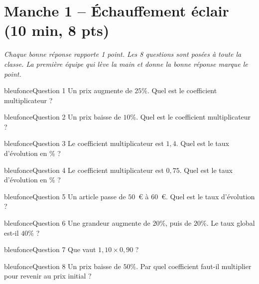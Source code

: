 \documentclass[12pt,a4paper]{article}
\begin{document}
\newpage

\section*{Manche 1 -- Échauffement éclair (10 min, 8 pts)}

\textit{Chaque bonne réponse rapporte 1 point. Les 8 questions sont posées à toute la classe. La première équipe qui lève la main et donne la bonne réponse marque le point.}

\vspace{0.3cm}

\begin{carte}{bleufonce}{Question 1}
Un prix augmente de \(25\%\). Quel est le coefficient multiplicateur ?
\end{carte}

\begin{carte}{bleufonce}{Question 2}
Un prix baisse de \(10\%\). Quel est le coefficient multiplicateur ?
\end{carte}

\begin{carte}{bleufonce}{Question 3}
Le coefficient multiplicateur est \(1{,}4\). Quel est le taux d’évolution en \% ?
\end{carte}

\begin{carte}{bleufonce}{Question 4}
Le coefficient multiplicateur est \(0{,}75\). Quel est le taux d’évolution en \% ?
\end{carte}

\begin{carte}{bleufonce}{Question 5}
Un article passe de \(50\)~\euro{} à \(60\)~\euro{}. Quel est le taux d’évolution ?
\end{carte}

\begin{carte}{bleufonce}{Question 6}
Une grandeur augmente de \(20\%\), puis de \(20\%\). Le taux global est-il \(40\%\) ?
\end{carte}

\begin{carte}{bleufonce}{Question 7}
Que vaut \(1{,}10 \times 0{,}90\) ?
\end{carte}

\begin{carte}{bleufonce}{Question 8}
Un prix baisse de \(50\%\). Par quel coefficient faut-il multiplier pour revenir au prix initial ?
\end{carte}
\end{document}
